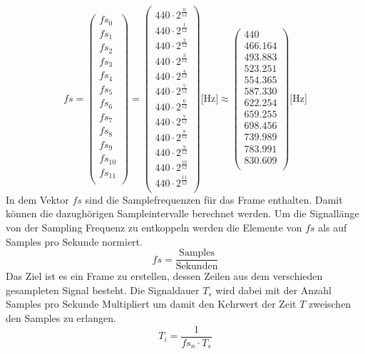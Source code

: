 \[
fs
=
 \begin{pmatrix}
fs_{0}\\[1mm]
fs_{1}\\[1mm]
fs_{2}\\[1mm]
fs_{3}\\[1mm]
fs_{4}\\[1mm]
fs_{5}\\[1mm]
fs_{6}\\[1mm]
fs_{7}\\[1mm]
fs_{8}\\[1mm]
fs_{9}\\[1mm]
fs_{10}\\[1mm]
fs_{11}\\[1mm]
\end{pmatrix}
=
\begin{pmatrix}
440\cdot2^{\frac{0}{12}}\\[0.5mm]
440\cdot2^{\frac{1}{12}}\\[0.5mm]
440\cdot2^{\frac{2}{12}}\\[0.5mm]
440\cdot2^{\frac{3}{12}}\\[0.5mm]
440\cdot2^{\frac{4}{12}}\\[0.5mm]
440\cdot2^{\frac{5}{12}}\\[0.5mm]
440\cdot2^{\frac{6}{12}}\\[0.5mm]
440\cdot2^{\frac{7}{12}}\\[0.5mm]
440\cdot2^{\frac{8}{12}}\\[0.5mm]
440\cdot2^{\frac{9}{12}}\\[0.5mm]
440\cdot2^{\frac{10}{12}}\\[0.5mm]
440\cdot2^{\frac{11}{12}}\\[0.5mm]
\end{pmatrix}
 \text{[Hz]}
 \approx
 \begin{pmatrix}
 440\\[1mm]
466.164\\[1mm]
493.883\\[1mm]
523.251\\[1mm]
554.365\\[1mm]
587.330\\[1mm]
622.254\\[1mm]
659.255\\[1mm]
698.456\\[1mm]
739.989\\[1mm]
783.991\\[1mm]
830.609\\[1mm]
 \end{pmatrix}
 \text{[Hz]} 
\]
In dem Vektor $fs$ sind die Samplefrequenzen für das Frame enthalten. Damit können die dazughörigen Sampleintervalle berechnet werden. Um die  Signallänge von der Sampling Frequenz zu entkoppeln werden die Elemente von $fs$ als auf Samples pro Sekunde normiert.  
\[fs = \frac{\text{Samples}}{\text{Sekunden}}\]
Das Ziel ist es ein Frame zu erstellen, dessen Zeilen aus dem verschieden gesampleten Signal besteht. Die Signaldauer $T_{s}$ wird dabei mit der Anzahl Samples pro Sekunde Multipliert um damit den Kehrwert der Zeit $T$ zweischen den Samples zu erlangen.
\[T_{i}=\frac{1}{fs_{n}\cdot T_{s}}\]

